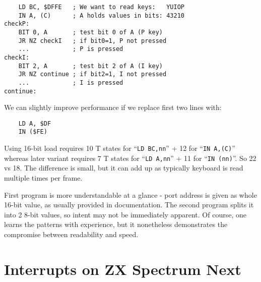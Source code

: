 \documentclass[12pt,twoside,openright,a4paper]{book}
\begin{document}
\begin{Verbatim}
	LD BC, $DFFE   ; We want to read keys:   YUIOP
	IN A, (C)      ; A holds values in bits: 43210
checkP:
	BIT 0, A       ; test bit 0 of A (P key)
	JR NZ checkI   ; if bit0=1, P not pressed
	...            ; P is pressed
checkI:
	BIT 2, A       ; test bit 2 of A (I key)
	JR NZ continue ; if bit2=1, I not pressed
	...            ; I is pressed
continue:
\end{Verbatim}

We can slightly improve performance if we replace first two lines with:

\begin{Verbatim}
	LD A, $DF
	IN ($FE)
\end{Verbatim}

Using 16-bit load requires 10 T states for ``{\tt LD BC,nn}'' + 12 for ``{\tt IN A,(C)}'' whereas later variant requires 7 T states for ``{\tt LD A,nn}'' + 11 for ``{\tt IN (nn)}''. So 22 vs 18. The difference is small, but it can add up as typically keyboard is read multiple times per frame.

First program is more understandable at a glance - port address is given as whole 16-bit value, as usually provided in documentation. The second program splits it into 2 8-bit values, so intent may not be immediately apparent. Of course, one learns the patterns with experience, but it nonetheless demonstrates the compromise between readability and speed.



\pagebreak
\section{Interrupts on ZX Spectrum Next}
\label{zx_next_interrupts}

\end{document}
